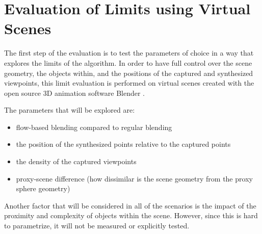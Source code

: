 \section{Evaluation of Limits using Virtual Scenes} \label{sec:limit_eval}
The first step of the evaluation is to test the parameters of choice in a way that explores the limits of the algorithm. In order to have full control over the scene geometry, the objects within, and the positions of the captured and synthesized viewpoints, this limit evaluation is performed on virtual scenes created with the open source 3D animation software Blender \cite{blender}.

The parameters that will be explored are:
\begin{itemize}
  \item flow-based blending compared to regular blending
  \item the position of the synthesized points relative to the captured points
  \item the density of the captured viewpoints
  \item proxy-scene difference (how dissimilar is the scene geometry from the proxy sphere geometry)
\end{itemize}

Another factor that will be considered in all of the scenarios is the impact of the proximity and complexity of objects within the scene. However, since this is hard to parametrize, it will not be measured or explicitly tested.


